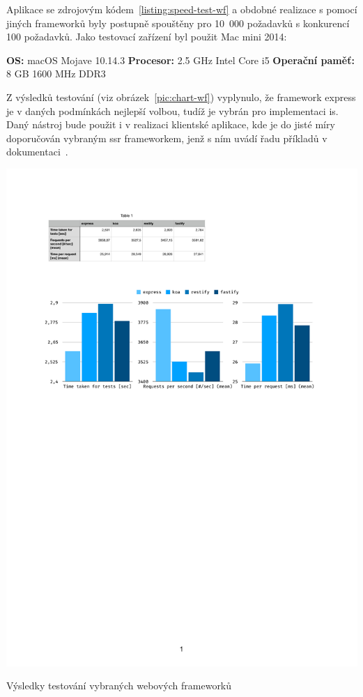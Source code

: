 \newpage

Aplikace se zdrojovým kódem~\ref{listing:speed-test-wf} a obdobné realizace s pomocí jiných frameworků byly postupně spouštěny pro 10~000 požadavků s konkurencí 100 požadavků. Jako testovací zařízení byl použit Mac mini 2014:

\textbf{OS:} macOS Mojave 10.14.3\newline
\textbf{Procesor:} 2.5 GHz Intel Core i5\newline
\textbf{Operační paměť:} 8 GB 1600 MHz DDR3

Z výsledků testování (viz obrázek~\ref{pic:chart-wf}) vyplynulo, že framework express je v daných podmínkách nejlepší volbou, tudíž je vybrán pro implementaci \gls{is}. Daný nástroj bude použit i v realizaci klientské aplikace, kde je do jisté míry doporučován vybraným \gls{ssr} frameworkem, jenž s ním uvádí řadu příkladů v dokumentaci~\cite{nextExpress}.


\begin{fig:illustration}
   \includegraphics[width=1\textwidth]{images/chart-wf.pdf}
   \caption{Výsledky testování vybraných webových frameworků}\label{pic:chart-wf}
\end{fig:illustration}



